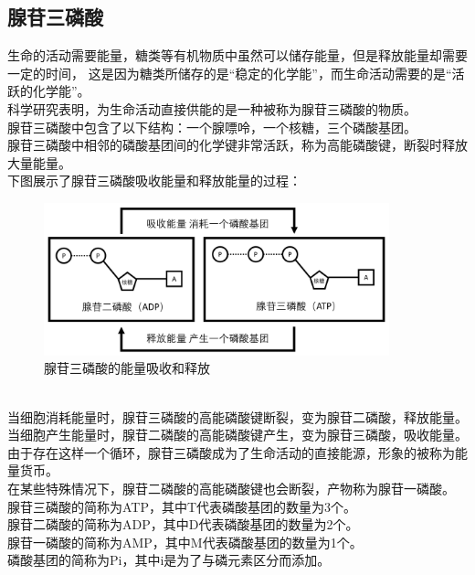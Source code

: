 \documentclass[UTF8]{ctexart}
\begin{document}
\subsection{腺苷三磷酸}
    生命的活动需要能量，糖类等有机物质中虽然可以储存能量，但是释放能量却需要一定的时间，
    这是因为糖类所储存的是“稳定的化学能”，而生命活动需要的是“活跃的化学能”。\\[3mm]
    科学研究表明，为生命活动直接供能的是一种被称为腺苷三磷酸的物质。\\[3mm]
    腺苷三磷酸中包含了以下结构：一个腺嘌呤，一个核糖，三个磷酸基团。\\[3mm]
    腺苷三磷酸中相邻的磷酸基团间的化学键非常活跃，称为高能磷酸键，断裂时释放大量能量。\\[6mm]
    下图展示了腺苷三磷酸吸收能量和释放能量的过程：\vspace{5pt}
    \begin{figure}[h!]
        \begin{center}
            \includegraphics[width=10cm]{BiologyImage/11.jpg}
            \caption{腺苷三磷酸的能量吸收和释放}
        \end{center}
    \end{figure}\\
    当细胞消耗能量时，腺苷三磷酸的高能磷酸键断裂，变为腺苷二磷酸，释放能量。\\[3mm]
    当细胞产生能量时，腺苷二磷酸的高能磷酸键产生，变为腺苷三磷酸，吸收能量。\\[3mm]
    由于存在这样一个循环，腺苷三磷酸成为了生命活动的直接能源，形象的被称为能量货币。\\[3mm]
    在某些特殊情况下，腺苷二磷酸的高能磷酸键也会断裂，产物称为腺苷一磷酸。\\[6mm]
    腺苷三磷酸的简称为ATP，其中T代表磷酸基团的数量为3个。\\[3mm]
    腺苷二磷酸的简称为ADP，其中D代表磷酸基团的数量为2个。\\[3mm]
    腺苷一磷酸的简称为AMP，其中M代表磷酸基团的数量为1个。\\[3mm]
    磷酸基团的简称为Pi，其中i是为了与磷元素区分而添加。
    
\end{document}
